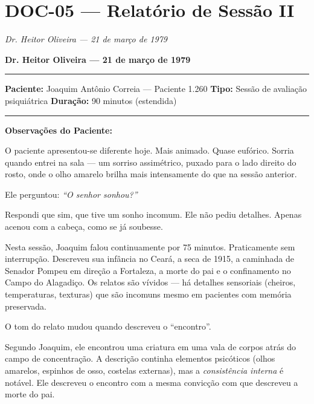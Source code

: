 \section*{\textbf{DOC-05} --- Relatório de Sessão II}

\noindent \textit{Dr. Heitor Oliveira --- 21 de março de 1979}

\noindent \textbf{Dr. Heitor Oliveira --- 21 de março de 1979}

\vspace{0.5em}\noindent\rule{\textwidth}{0.5pt}\vspace{0.5em}

\noindent \textbf{Paciente:} Joaquim Antônio Correia --- Paciente 1.260
\textbf{Tipo:} Sessão de avaliação psiquiátrica
\textbf{Duração:} 90 minutos (estendida)

\vspace{0.5em}\noindent\rule{\textwidth}{0.5pt}\vspace{0.5em}

\noindent \textbf{Observações do Paciente:}

\noindent O paciente apresentou-se diferente hoje. Mais animado. Quase eufórico. Sorria quando entrei na sala --- um sorriso assimétrico, puxado para o lado direito do rosto, onde o olho amarelo brilha mais intensamente do que na sessão anterior.

\noindent Ele perguntou: \textit{\textquotedblleft{}O senhor sonhou?\textquotedblright{}}

\noindent Respondi que sim, que tive um sonho incomum. Ele não pediu detalhes. Apenas acenou com a cabeça, como se já soubesse.

\noindent Nesta sessão, Joaquim falou continuamente por 75 minutos. Praticamente sem interrupção. Descreveu sua infância no Ceará, a seca de 1915, a caminhada de Senador Pompeu em direção a Fortaleza, a morte do pai e o confinamento no Campo do Alagadiço. Os relatos são vívidos --- há detalhes sensoriais (cheiros, temperaturas, texturas) que são incomuns mesmo em pacientes com memória preservada.

\noindent O tom do relato mudou quando descreveu o \textquotedblleft{}encontro\textquotedblright{}.

\noindent Segundo Joaquim, ele encontrou uma criatura em uma vala de corpos atrás do campo de concentração. A descrição continha elementos psicóticos (olhos amarelos, espinhos de osso, costelas externas), mas a \textit{consistência interna} é notável. Ele descreveu o encontro com a mesma convicção com que descreveu a morte do pai.

